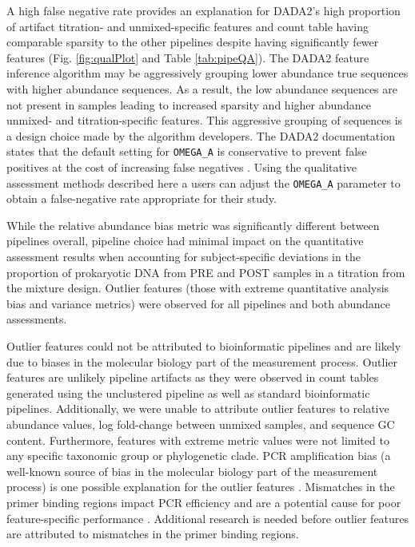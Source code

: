 \documentclass[linenumbers]{bmcart}
\begin{document}
A high false negative rate provides an explanation for DADA2's high proportion of artifact titration- and unmixed-specific features and count table having comparable sparsity to the other pipelines despite having significantly fewer features (Fig. \ref{fig:qualPlot} and Table \ref{tab:pipeQA}).
The DADA2 feature inference algorithm may be aggressively grouping lower abundance true sequences with higher abundance sequences.
As a result, the low abundance sequences are not present in samples leading to increased sparsity and higher abundance unmixed- and titration-specific features.
This aggressive grouping of sequences is a design choice made by the algorithm developers.
The DADA2 documentation states that the default setting for \texttt{OMEGA\_A} is conservative to prevent false positives at the cost of increasing false negatives \cite{callahan2016dada2}.
Using the qualitative assessment methods described here a users can adjust the \texttt{OMEGA\_A} parameter to obtain a false-negative rate appropriate for their study.

While the relative abundance bias metric was significantly different
between pipelines overall, pipeline choice had minimal impact on the
quantitative assessment results when accounting for subject-specific deviations in the proportion of prokaryotic DNA from PRE and POST samples in a titration from the mixture design. Outlier features (those with extreme quantitative analysis bias
and variance metrics) were observed for all pipelines and both abundance assessments.

Outlier features could not be attributed to bioinformatic pipelines and are likely due to biases in the molecular biology part of the measurement process.
Outlier features are unlikely pipeline artifacts as they were observed in count tables generated
using the unclustered pipeline as well as standard bioinformatic
pipelines. Additionally, we were unable to attribute outlier features to relative
abundance values, log fold-change between unmixed samples, and sequence
GC content. Furthermore, features with extreme metric values were not limited to any
specific taxonomic group or phylogenetic clade. PCR amplification bias (a well-known source of bias in the molecular biology part of the
measurement process) is one possible explanation for the outlier features \cite{Sze565598}.
Mismatches in the primer binding regions impact PCR efficiency and are a potential cause for poor feature-specific
performance \cite{wright2014exploiting}. Additional research is needed before outlier features are attributed to mismatches in the primer binding regions.
\end{document}
